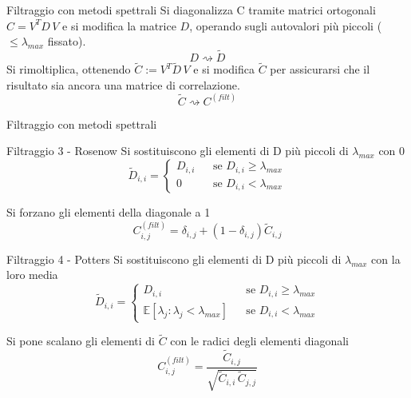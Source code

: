 \documentclass{beamer}
\newcommand{\1}{\mathbbm{1}}
\begin{document}
\begin{frame}{Filtraggio con metodi spettrali}
Si diagonalizza C tramite matrici ortogonali $C = V^TD\,V$ e si modifica la matrice $D$, operando sugli autovalori più piccoli ($\leq \lambda_{max}$ fissato).
\[
D\rightsquigarrow\tilde{D}
\]
\pause
Si rimoltiplica, ottenendo $\tilde{C} := V^T\tilde{D}\,V$ e si modifica $\tilde{C}$ per assicurarsi che il risultato sia ancora una matrice di correlazione.
\[
\tilde{C}\rightsquigarrow C^{(filt)}
\]

\end{frame}

\begin{frame}{Filtraggio con metodi spettrali}
\vspace{-5pt}
\begin{block}{Filtraggio 3 - Rosenow}
Si sostituiscono gli elementi di D più piccoli di $\lambda_{max}$ con 0
\vspace{-8pt}
\[
\tilde{D}_{i,i} = \left\{
\begin{array}{ccl}
D_{i,i}  & & \text{se } D_{i,i}\geq \lambda_{max} \\
0 & & \text{se } D_{i,i} < \lambda_{max} 
\end{array}
\right.
\]
\vspace{-13pt}

Si forzano gli elementi della diagonale a 1
\vspace{-10pt}
\[
C^{(filt)}_{i,j} = \delta_{i,j} + (1-\delta_{i,j})\tilde{C}_{i,j}
\]
\end{block}
\pause
\vspace{-5pt}
\begin{block}{Filtraggio 4 - Potters}
Si sostituiscono gli elementi di D più piccoli di $\lambda_{max}$ con la loro media
\vspace{-10pt}
\[
\tilde{D}_{i,i} = \left\{
\begin{array}{ccl}
D_{i,i}  & & \text{se } D_{i,i}\geq \lambda_{max} \\
\mathbb{E}[\lambda_j : \lambda_j<\lambda_{max}] & & \text{se } D_{i,i} < \lambda_{max} 
\end{array}
\right.
\]
\vspace{-10pt}

Si pone scalano gli elementi di $\tilde{C}$ con le radici degli elementi diagonali
\vspace{-10pt}
\[
C^{(filt)}_{i,j} = \frac{\tilde{C}_{i,j}}{\sqrt{\tilde{C}_{i,i} \, \tilde{C}_{j,j}}}
\]
\end{block}
\end{frame}
\end{document}
